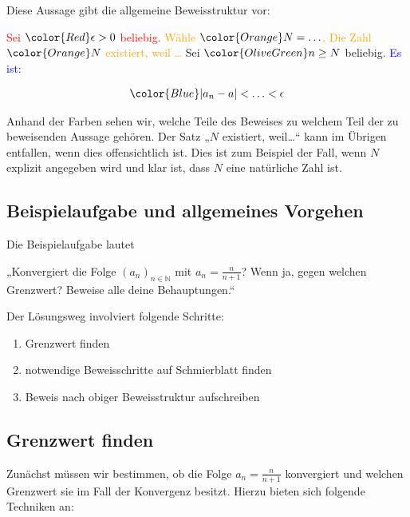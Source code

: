 \documentclass[fontsize=9pt,
               parskip=half-,
               DIV=14,
               listof=chapterentry,
               tocflat]{scrbook}
\begin{document}
Diese Aussage gibt die allgemeine Beweisstruktur vor:

\begin{importantparagraph*}
{\textcolor{Red}{Sei ${\color {Red}\epsilon >0}$ beliebig.}} {\textcolor{Orange}{Wähle ${\color {Orange}N=\ldots }$. Die Zahl ${\color {Orange}N}$ existiert, weil …}} {\textcolor{OliveGreen}{Sei ${\color {OliveGreen}n\geq N}$ beliebig.}} {\textcolor{Blue}{Es ist:}}

\begin{align*}
{\color {Blue}|a_{n}-a|<\ldots <\epsilon }
\end{align*}

\end{importantparagraph*}

Anhand der Farben sehen wir, welche Teile des Beweises zu welchem Teil der zu beweisenden Aussage gehören. Der Satz „$N$ existiert, weil…“ kann im Übrigen entfallen, wenn dies offensichtlich ist. Dies ist zum Beispiel der Fall, wenn $N$ explizit angegeben wird und klar ist, dass $N$ eine natürliche Zahl ist.

\subsection{Beispielaufgabe und allgemeines Vorgehen}

Die Beispielaufgabe lautet

\begin{importantparagraph*}
„Konvergiert die Folge $(a_{n})_{n\in \mathbb {N} }$ mit $a_{n}={\tfrac {n}{n+1}}$? Wenn ja, gegen welchen Grenzwert? Beweise alle deine Behauptungen.“

\end{importantparagraph*}

Der Lösungsweg involviert folgende Schritte:

\begin{enumerate}
\item Grenzwert finden
\item notwendige Beweisschritte auf Schmierblatt finden
\item Beweis nach obiger Beweisstruktur aufschreiben
\end{enumerate}

\subsection{Grenzwert finden}

Zunächst müssen wir bestimmen, ob die Folge $a_{n}={\tfrac {n}{n+1}}$ konvergiert und welchen Grenzwert sie im Fall der Konvergenz besitzt. Hierzu bieten sich folgende Techniken an:
\end{document}
